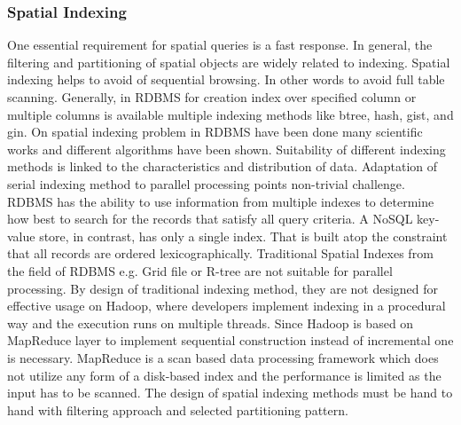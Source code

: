 \documentclass[a4paper,12pt,oneside]{report}
\begin{document}
	
	
	\subsubsection{Spatial Indexing}
	\label{Spatial_Indexing}
	One essential requirement for spatial queries is a fast response. 
	In general, the filtering and partitioning  of spatial objects are widely
	related to indexing. 
	Spatial indexing helps to avoid of sequential browsing. In other words to avoid
	full table scanning.
	Generally, in RDBMS for creation index over specified column or multiple columns
	is available multiple 
	indexing methods like btree, hash, gist, and gin. On spatial indexing problem in
	RDBMS have 
	been done many scientific works and different algorithms have been shown.
	Suitability of 
	different indexing methods is linked to the characteristics and distribution of
	data. 
	Adaptation of serial indexing method to parallel processing points non-trivial
	challenge. 
	RDBMS has the ability to use information from multiple indexes to determine how
	best
	to search for the records that satisfy all query criteria. A
	NoSQL key-value store, in contrast, has only a single index.
	That is built atop the constraint that all records are ordered
	lexicographically. Traditional 
	Spatial Indexes from the field of RDBMS e.g. Grid file or R-tree are not
	suitable for parallel 
	processing. By design of traditional indexing method, they are not designed for
	effective 
	usage on Hadoop, where developers implement indexing in a procedural way and the
	execution 
	runs on multiple threads. Since Hadoop is based on MapReduce layer to implement 
	sequential construction instead of incremental one  is necessary.  
	MapReduce is a scan based data processing framework which does not utilize any
	form of a disk-based 
	index and the performance is limited as the input has to be scanned. The design
	of spatial indexing methods 
	must be hand to hand with filtering approach and selected partitioning pattern. 
	
	
\end{document}
